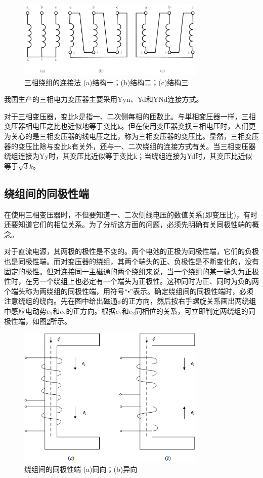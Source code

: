 \documentclass{book}
\begin{document}
\begin{figure}[H]
	\centering
	\includegraphics[width=0.80\textwidth]{4-3.png}
	\caption{三相绕组的连接法
		(a)结构一；(b)结构二；(c)结构三}
	\label{fig_4.3}
\end{figure}

我国生产的三相电力变压器主要采用Yyn、Yd和YNd连接方式。

对于三相变压器，变比k是指一、二次侧每相的匝数比。与単相変圧器一样，三相变压器相电压之比也近似地等于变比k。但在使用变压器变换三相电压时，人们更为关心的是三相变压器的线电压之比，称为三相变压器的变压比。显然，三相变压器的变压比除与变比k有关外，还与一、二次绕组的连接方式有关。当三相变压器绕组连接为Yy时，其变压比近似等于变比k；当绕组连接为Yd时，其变压比近似等于$\sqrt{3}k$。

\subsection{绕组间的同极性端}

在使用三相变压器时，不但要知道一、二次侧线电压的数值关系(即变压比)，有时还要知道它们的相位关系。为了分析这方面的问题，必须先明确有关同极性端的概念。

对于直流电源，其两极的极性是不变的。两个电池的正极为同极性端，它们的负极也是同极性端。而对变压器的绕组，其两个端头的正、负极性是不断变化的，没有固定的极性。但对连接同一主磁通的两个绕组来说，当一个绕组的某一端头为正极性时，在另一个绕组上也必定有一个端头为正极性。这种同时为正、同时为负的两个端头称为两绕组的同极性端，用符号“$\centerdot $”表示。确定绕组间的同极性端时，必须注意绕组的绕向。先在图中给出磁通$\phi $的正方向，然后按右手螺旋关系画出两绕组中感应电动势${{e}_{1}}$和${{e}_{2}}$的正方向。根据${{e}_{1}}$和${{e}_{2}}$同相位的关系，可立即判定两绕组的同极性端，如图\ref{fig_4.4}所示。
\begin{figure}[H]
	\centering
	\includegraphics[width=0.80\textwidth]{4-4g.png}
	\caption{绕组间的同极性端
		(a)同向；(b)异向
	}
	\label{fig_4.4}
\end{figure}
\end{document}
